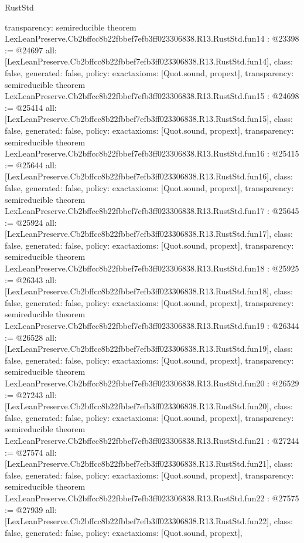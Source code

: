\begin{lexlean}{RustStd}
\begin{coremodule}
{  transparency: semireducible
}
theorem LexLeanPreserve.Cb2bffcc8b22fbbef7efb3ff023306838.R13.RustStd.fun14 : @23398 := @24697 {
  all: [LexLeanPreserve.Cb2bffcc8b22fbbef7efb3ff023306838.R13.RustStd.fun14],
  class: false,
  generated: false,
  policy: exact{axioms: [Quot.sound, propext]},
  transparency: semireducible
}
theorem LexLeanPreserve.Cb2bffcc8b22fbbef7efb3ff023306838.R13.RustStd.fun15 : @24698 := @25414 {
  all: [LexLeanPreserve.Cb2bffcc8b22fbbef7efb3ff023306838.R13.RustStd.fun15],
  class: false,
  generated: false,
  policy: exact{axioms: [Quot.sound, propext]},
  transparency: semireducible
}
theorem LexLeanPreserve.Cb2bffcc8b22fbbef7efb3ff023306838.R13.RustStd.fun16 : @25415 := @25644 {
  all: [LexLeanPreserve.Cb2bffcc8b22fbbef7efb3ff023306838.R13.RustStd.fun16],
  class: false,
  generated: false,
  policy: exact{axioms: [Quot.sound, propext]},
  transparency: semireducible
}
theorem LexLeanPreserve.Cb2bffcc8b22fbbef7efb3ff023306838.R13.RustStd.fun17 : @25645 := @25924 {
  all: [LexLeanPreserve.Cb2bffcc8b22fbbef7efb3ff023306838.R13.RustStd.fun17],
  class: false,
  generated: false,
  policy: exact{axioms: [Quot.sound, propext]},
  transparency: semireducible
}
theorem LexLeanPreserve.Cb2bffcc8b22fbbef7efb3ff023306838.R13.RustStd.fun18 : @25925 := @26343 {
  all: [LexLeanPreserve.Cb2bffcc8b22fbbef7efb3ff023306838.R13.RustStd.fun18],
  class: false,
  generated: false,
  policy: exact{axioms: [Quot.sound, propext]},
  transparency: semireducible
}
theorem LexLeanPreserve.Cb2bffcc8b22fbbef7efb3ff023306838.R13.RustStd.fun19 : @26344 := @26528 {
  all: [LexLeanPreserve.Cb2bffcc8b22fbbef7efb3ff023306838.R13.RustStd.fun19],
  class: false,
  generated: false,
  policy: exact{axioms: [Quot.sound, propext]},
  transparency: semireducible
}
theorem LexLeanPreserve.Cb2bffcc8b22fbbef7efb3ff023306838.R13.RustStd.fun20 : @26529 := @27243 {
  all: [LexLeanPreserve.Cb2bffcc8b22fbbef7efb3ff023306838.R13.RustStd.fun20],
  class: false,
  generated: false,
  policy: exact{axioms: [Quot.sound, propext]},
  transparency: semireducible
}
theorem LexLeanPreserve.Cb2bffcc8b22fbbef7efb3ff023306838.R13.RustStd.fun21 : @27244 := @27574 {
  all: [LexLeanPreserve.Cb2bffcc8b22fbbef7efb3ff023306838.R13.RustStd.fun21],
  class: false,
  generated: false,
  policy: exact{axioms: [Quot.sound, propext]},
  transparency: semireducible
}
theorem LexLeanPreserve.Cb2bffcc8b22fbbef7efb3ff023306838.R13.RustStd.fun22 : @27575 := @27939 {
  all: [LexLeanPreserve.Cb2bffcc8b22fbbef7efb3ff023306838.R13.RustStd.fun22],
  class: false,
  generated: false,
  policy: exact{axioms: [Quot.sound, propext]},
}
\end{coremodule}
\end{lexlean}
